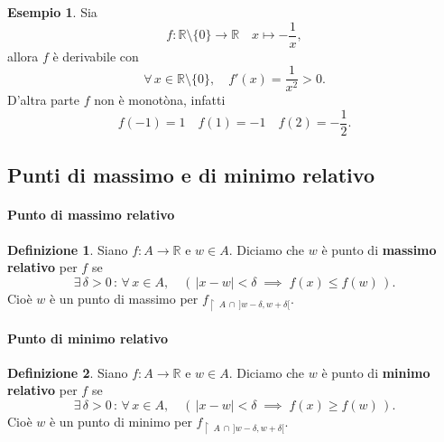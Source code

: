 \documentclass{article}
\theoremstyle{plain}
\theoremstyle{definition}
\newtheorem{defn}{Definizione}[section]
\newtheorem{exmp}{Esempio}[section]
\theoremstyle{remark}
\begin{document}
\vspace{10pt}

\begin{exmp}
    Sia \[f:\mathbb{R}\setminus\{0\}\to\mathbb{R}\quad x\mapsto-\dfrac{1}{x},\]
    allora $f$ è derivabile con 
    \[\forall\,x\in \mathbb{R}\setminus\{0\},\quad f'(x)=\dfrac{1}{x^2}>0.\]
    D'altra parte $f$ non è monotòna, infatti 
    \[f(-1)=1 \quad f(1)=-1 \quad f(2)=-\dfrac{1}{2}.\]
\end{exmp}

\vspace{10pt}

\subsection{Punti di massimo e di minimo relativo}

\vspace{10pt}

\paragraph{Punto di massimo relativo}
\begin{bxthm}
\begin{defn}
    Siano $f:A\to\mathbb{R}$ e $w\in A$.
    Diciamo che $w$ è punto di \textbf{massimo relativo} per $f$ se 
    \[\exists\,\delta>0\,:\,\forall\, x\in A,\quad (\,|x-w|<\delta\;\implies\; f(x)\leq f(w)\,).\]
    Cioè $w$ è un punto di massimo per \(f_{\upharpoonright \  A\,\cap\,]w-\delta,w+\delta[}.\)
\end{defn}
\end{bxthm}

\vspace{10pt}

\paragraph{Punto di minimo relativo}
\begin{bxthm}
\begin{defn}
    Siano $f:A\to\mathbb{R}$ e $w\in A$.
    Diciamo che $w$ è punto di \textbf{minimo relativo} per $f$ se 
    \[\exists\,\delta>0\,:\,\forall\, x\in A,\quad (\,|x-w|<\delta\;\implies\; f(x)\geq f(w)\,).\]
    Cioè $w$ è un punto di minimo per \(f_{\upharpoonright \  A\,\cap\,]w-\delta,w+\delta[}.\)
\end{defn}
\end{bxthm}

\vspace{10pt}
\end{document}
